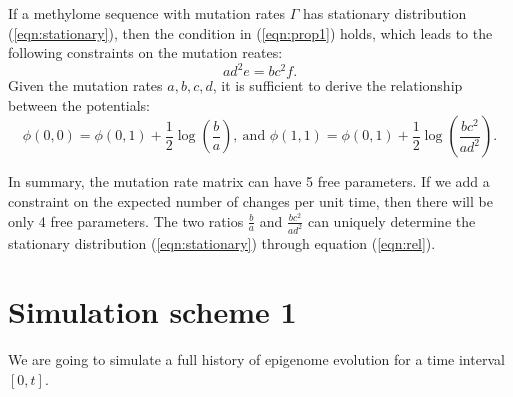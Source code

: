 \documentclass[11pt]{article}
\begin{document}
If a methylome sequence with mutation rates $\Gamma$ has stationary
distribution (\ref{eqn:stationary}), then the condition in
(\ref{eqn:prop1}) holds, which leads to the following constraints on
the mutation reates:
\[
  ad^2e=bc^2f.
\]
Given the mutation rates $a,b,c,d$, it is sufficient to derive the relationship
between the potentials:
\begin{equation}\label{eqn:rel}
  \phi(0,0) = \phi(0,1) +\frac{1}{2}\log(\frac{b}{a}), ~\text{and~}
  \phi(1,1) = \phi(0,1) +\frac{1}{2}\log(\frac{bc^2}{ad^2}).
\end{equation}

In summary, the mutation rate matrix can have 5 free parameters. If we
add a constraint on the expected number of changes per unit time, then
there will be only 4 free parameters. The two ratios $\frac{b}{a}$ and
$\frac{bc^2}{ad^2}$ can uniquely determine the stationary distribution
(\ref{eqn:stationary}) through equation (\ref{eqn:rel}).

\section{Simulation scheme 1}
We are going to simulate a full history of epigenome evolution for a
time interval $[0, t]$.
\end{document}
